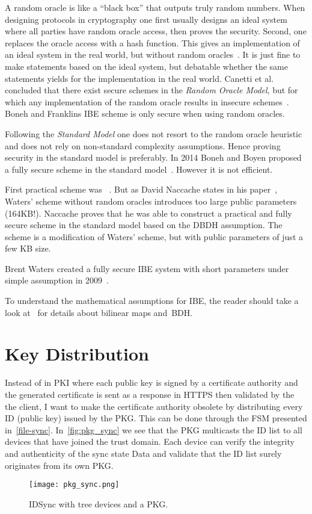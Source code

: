 A random oracle is like a ``black box'' that outputs truly random numbers.
When designing protocols in cryptography one first usually designs an ideal system where all parties have random oracle access, then proves the security.
Second, one replaces the oracle access with a hash function.
This gives an implementation of an ideal system in the real world, but without random oracles~\cite{DBLP:conf/ccs/BellareR93}. 
It is just fine to make statements based on the ideal system, but debatable whether the same statements yields for the implementation in the real world.
Canetti et al. concluded that there exist secure schemes in the \textit{Random Oracle Model}, but for which any implementation of the random oracle results in insecure schemes~\cite{DBLP:journals/jacm/CanettiGH04}.
Boneh and Franklins \gls{IBE} scheme is only secure when using random oracles.

Following the \textit{Standard Model} one does not resort to the random oracle heuristic and does not rely on non-standard complexity assumptions.
Hence proving security in the standard model is preferably.
In 2014 Boneh and Boyen proposed a fully secure scheme in the standard model~\cite{DBLP:conf/crypto/BonehB04}.
However it is not efficient. 

First practical scheme was ~\cite{DBLP:journals/iacr/Waters04}.
But as David Naccache states in his paper~\cite{DBLP:journals/iacr/Naccache05}, Waters' scheme without random oracles introduces too large public parameters (164\gls{KB}!).
Naccache proves that he was able to construct a practical and fully secure scheme in the standard model based on the \gls{DBDH} assumption.
The scheme is a modification of Waters' scheme, but with public parameters of just a few \gls{KB} size.

Brent Waters created a fully secure \gls{IBE} system with short parameters under simple assumption in 2009~\cite{DBLP:conf/crypto/Waters09}.

To understand the mathematical assumptions for \gls{IBE}, the reader should take a look at~\cite[section 3]{DBLP:conf/crypto/BonehF01} for details about bilinear maps and~\gls{BDH}.

\section{Key Distribution}\label{key-distribution}
Instead of in \gls{PKI} where each public key is signed by a certificate authority and the generated certificate is sent as a response in \gls{HTTPS} then validated by the the client, I want to make the certificate authority obsolete by distributing every \gls{ID} (public key) issued by the \gls{PKG}.
This can be done through the \gls{FSM} presented in~\autoref{file-sync}.
In~\autoref{fig:pkg_sync} we see that the \gls{PKG} multicasts the \gls{ID} list to all devices that have joined the trust domain.
Each device can verify the integrity and authenticity of the sync state Data and validate that the \gls{ID} list surely originates from its own \gls{PKG}.
\begin{figure}[ht]
  \centering
  \texttt{[image: pkg\_sync.png]}
  \caption{IDSync with tree devices and a PKG.}
  \label{fig:pkg_sync}
\end{figure}

